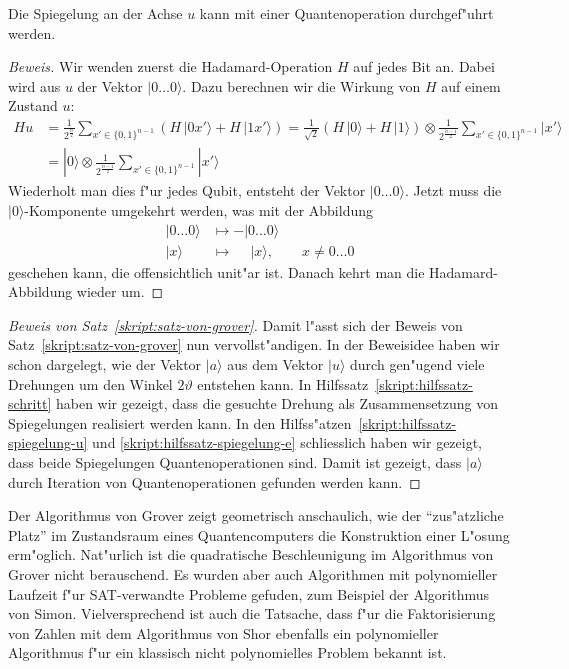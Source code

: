 \begin{hilfssatz}
Die Spiegelung an der Achse $u$ kann mit einer Quantenoperation
durchgef"uhrt werden.
\label{skript:hilfssatz-spiegelung-u}
\end{hilfssatz}

\begin{proof}[Beweis]
Wir wenden zuerst die Hadamard-Operation $H$ auf jedes Bit an.
Dabei wird aus $u$ der Vektor $|0\dots 0\rangle$.
Dazu berechnen wir die Wirkung von $H$ auf einem Zustand $u$:
\begin{align*}
Hu
&=
\frac1{2^{\frac{n}2}}\sum_{x'\in\{0,1\}^{n-1}}(H\,|0x'\rangle + H\,|1x'\rangle)
=
\frac1{\sqrt{2}}(H\,|0\rangle + H\,|1\rangle)\otimes
  \frac1{2^{\frac{n-1}2}}\sum_{x'\in\{0,1\}^{n-1}} |x'\rangle
\\
&=
|0\rangle\otimes
  \frac1{2^{\frac{n-1}2}}\sum_{x'\in\{0,1\}^{n-1}} |x'\rangle
\end{align*}
Wiederholt man dies f"ur jedes Qubit, entsteht der Vektor $|0\dots 0\rangle$.
Jetzt muss die $|0\rangle$-Komponente umgekehrt werden, was mit der Abbildung
\begin{align*}
|0\dots0\rangle&\mapsto          - |0\dots0\rangle\\
|x\rangle      &\mapsto \phantom{-}|x\rangle,\qquad x\ne 0\dots 0
\end{align*}
geschehen kann, die offensichtlich unit"ar ist.
Danach kehrt man die Hadamard-Abbildung wieder um.
\end{proof}

\begin{proof}[Beweis von Satz~\ref{skript:satz-von-grover}]
Damit l"asst sich der Beweis von Satz~\ref{skript:satz-von-grover}
nun vervollst"andigen.
In der Beweisidee haben wir schon dargelegt, wie der Vektor
$|a\rangle$ aus dem Vektor $|u\rangle$ durch gen"ugend viele
Drehungen um den Winkel $2\vartheta$ entstehen kann.
In Hilfssatz~\ref{skript:hilfssatz-schritt} haben wir gezeigt, dass
die gesuchte Drehung als Zusammensetzung von Spiegelungen realisiert
werden kann.
In den Hilfss"atzen~\ref{skript:hilfssatz-spiegelung-u} und
\ref{skript:hilfssatz-spiegelung-e} schliesslich haben wir gezeigt,
dass beide Spiegelungen Quantenoperationen sind.
Damit ist gezeigt, dass $|a\rangle$ durch Iteration von
Quantenoperationen gefunden werden kann.
\end{proof}

Der Algorithmus von Grover zeigt geometrisch anschaulich, wie der
``zus"atzliche Platz'' im Zustandsraum eines Quantencomputers
die Konstruktion einer L"osung erm"oglich.
Nat"urlich ist die quadratische Beschleunigung im Algorithmus
von Grover nicht berauschend.
Es wurden aber auch Algorithmen mit polynomieller Laufzeit f"ur
SAT-verwandte Probleme gefuden, zum Beispiel der Algorithmus von
Simon.
Vielversprechend ist auch die Tatsache, dass f"ur die Faktorisierung
von Zahlen mit dem Algorithmus von Shor \cite{skript:arorabarak}
ebenfalls ein polynomieller Algorithmus f"ur ein klassisch
nicht polynomielles Problem bekannt ist.

